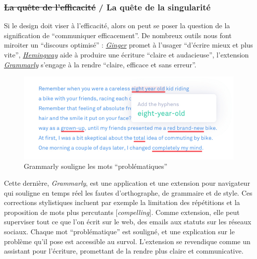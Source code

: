 \documentclass[]{article}
\begin{document}
\newpage

\hypertarget{la-quuxeate-de-lefficacituxe9-la-quuxeate-de-la-singularituxe9}{%
\subsubsection{\texorpdfstring{\sout{La quête de l'efficacité} / La
quête de la
singularité}{La quête de l'efficacité / La quête de la singularité}}\label{la-quuxeate-de-lefficacituxe9-la-quuxeate-de-la-singularituxe9}}

Si le design doit viser à l'efficacité, alors on peut se poser la
question de la signification de ``communiquer efficacement''. De
nombreux outils nous font miroiter un ``discours optimisé'' :
\href{http://www.gingersoftware.com/fr}{\emph{Ginger}} promet à l'usager
``d'écrire mieux et plus vite'',
\href{http://www.hemingwayapp.com/}{\emph{Hemingway}} aide à produire
une écriture ``claire et audacieuse'', l'extension
\href{https://www.grammarly.com/}{\emph{Grammarly}} s'engage à la rendre
``claire, efficace et sans erreur''.

\begin{figure}
\centering
\includegraphics{./tex2pdf.15892/7e83c21e6796d91bba646886acdde75e134357da.jpg}
\caption{Grammarly souligne les mots ``problématiques''}
\end{figure}

Cette dernière, \emph{Grammarly}, est une application et une extension
pour navigateur qui souligne en temps réel les fautes d'orthographe, de
grammaire et de style. Ces corrections stylistiques incluent par exemple
la limitation des répétitions et la proposition de mots plus percutants
{[}\emph{compelling}{]}. Comme extension, elle peut superviser tout ce
que l'on écrit sur le web, des emails aux statuts sur les réseaux
sociaux. Chaque mot ``problématique'' est souligné, et une explication
sur le problème qu'il pose est accessible au survol. L'extension se
revendique comme un assistant pour l'écriture, promettant de la rendre
plus claire et communicative.
\end{document}
